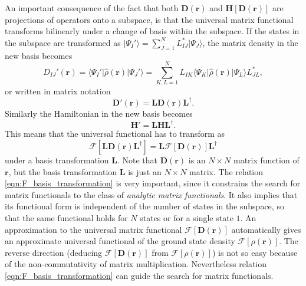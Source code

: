 \documentclass[journal=jacsat,manuscript=article]{achemso}
\newcommand\m[1]{\mathbf{#1}}
\renewcommand\vec[1]{\mathbf{#1}}
\begin{document}
An important consequence of the fact that both $\m{D}(\vec{r})$ and $\m{H}[\m{D}(\vec{r})]$ are projections of operators onto a subspace, is
that the universal matrix functional transforms bilinearly under a change of basis within the subspace. \cite[(3)]{Lu2022JPCL}
If the states in the subspace are transformed as $\vert \Psi_I' \rangle = \sum_{J=1}^N L^*_{IJ} \vert \Psi_J \rangle$,
the matrix density in the new basis becomes
\begin{equation}
D_{IJ}'(\vec{r}) = \langle \Psi_I' \vert \hat{\rho}(\vec{r}) \vert \Psi_J' \rangle
= \sum_{K,L=1}^{N} L_{IK} \langle \Psi_K \vert \hat{\rho}(\vec{r}) \vert \Psi_L \rangle L^*_{JL},
\end{equation}
or written in matrix notation
\begin{equation}
\m{D}'(\vec{r}) = \m{L} \m{D}(\vec{r}) \m{L}^{\dagger}.
\end{equation}
Similarly the Hamiltonian in the new basis becomes
\begin{equation}
\m{H}' = \m{L} \m{H} \m{L}^{\dagger}.
\end{equation}
This means that the universal functional has to transform as \cite{Lu2022JPCL}
\begin{equation}
 \m{\mathcal{F}}[\m{L} \m{D}(\vec{r}) \m{L}^{\dagger}] = \m{L} \m{\mathcal{F}}[\m{D}(\vec{r})] \m{L}^{\dagger} \label{eqn:F_basis_transformation}
\end{equation}
under a basis transformation $\m{L}$. Note that $\m{D}(\vec{r})$ is an $N \times N$ matrix function of $\vec{r}$,
but the basis transformation $\m{L}$ is just an $N \times N$ matrix.
 The relation \ref{eqn:F_basis_transformation} is very important, since it constrains
the search for matrix functionals to the class of \emph{analytic matrix functionals}. It also implies that its functional form
is independent of the number of states in the subspace, so that the same functional holds for $N$ states or for a single state $1$.
An approximation to the universal matrix functional $\m{\mathcal{F}}[\m{D}(\vec{r})]$ automatically gives an approximate universal
functional of the ground state density $\mathcal{F}[\rho(\vec{r})]$. The reverse direction (deducing $\m{\mathcal{F}}[\m{D}(\vec{r})]$
from $\mathcal{F}[\rho(\vec{r})]$) is not so easy because of the non-commutativity of matrix multiplication.
Nevertheless relation \ref{eqn:F_basis_transformation} can guide the search for matrix functionals.
\end{document}
